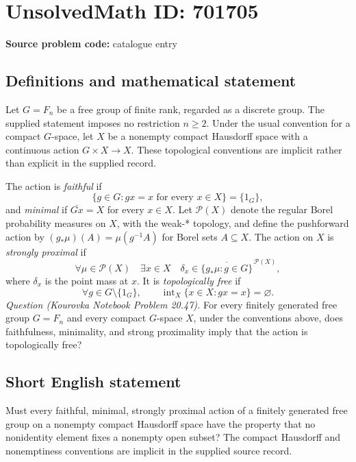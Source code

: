 \documentclass[11pt]{article}
\begin{document}
\section*{UnsolvedMath ID: 701705}
\textbf{Source problem code:} catalogue entry
\subsection{Definitions and mathematical statement}
Let \(G=F_n\) be a free group of finite rank, regarded as a discrete group. The supplied statement imposes no restriction \(n\geq 2\). Under the usual convention for a compact \(G\)-space, let \(X\) be a nonempty compact Hausdorff space with a continuous action \(G\times X\to X\). These topological conventions are implicit rather than explicit in the supplied record.

The action is \emph{faithful} if
\[
\{g\in G: gx=x\text{ for every }x\in X\}=\{1_G\},
\]
and \emph{minimal} if \(\overline{Gx}=X\) for every \(x\in X\). Let \(\mathcal P(X)\) denote the regular Borel probability measures on \(X\), with the weak-* topology, and define the pushforward action by \((g_*\mu)(A)=\mu(g^{-1}A)\) for Borel sets \(A\subseteq X\). The action on \(X\) is \emph{strongly proximal} if
\[
\forall\mu\in\mathcal P(X)\quad\exists x\in X\quad
\delta_x\in\overline{\{g_*\mu:g\in G\}}^{\,\mathcal P(X)},
\]
where \(\delta_x\) is the point mass at \(x\). It is \emph{topologically free} if
\[
\forall g\in G\setminus\{1_G\},\qquad
\operatorname{int}_X\{x\in X:gx=x\}=\varnothing.
\]
\emph{Question (Kourovka Notebook Problem 20.47).} For every finitely generated free group \(G=F_n\) and every compact \(G\)-space \(X\), under the conventions above, does faithfulness, minimality, and strong proximality imply that the action is topologically free?
\subsection{Short English statement}
Must every faithful, minimal, strongly proximal action of a finitely generated free group on a nonempty compact Hausdorff space have the property that no nonidentity element fixes a nonempty open subset? The compact Hausdorff and nonemptiness conventions are implicit in the supplied source record.
\end{document}
